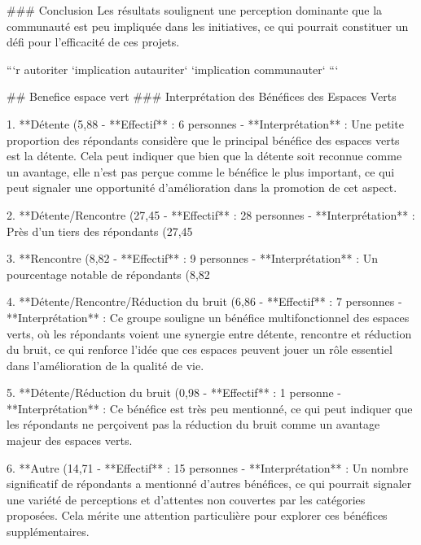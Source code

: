 ### Conclusion
Les résultats soulignent une perception dominante que la communauté est peu impliquée dans les initiatives, ce qui pourrait constituer un défi pour l'efficacité de ces projets.

```{r autoriter}
`implication autauriter`
`implication communauter`
```

## Benefice espace vert
### Interprétation des Bénéfices des Espaces Verts

1. **Détente (5,88%
   - **Effectif** : 6 personnes
   - **Interprétation** : Une petite proportion des répondants considère que le principal bénéfice des espaces verts est la détente. Cela peut indiquer que bien que la détente soit reconnue comme un avantage, elle n'est pas perçue comme le bénéfice le plus important, ce qui peut signaler une opportunité d'amélioration dans la promotion de cet aspect.

2. **Détente/Rencontre (27,45%
   - **Effectif** : 28 personnes
   - **Interprétation** : Près d'un tiers des répondants (27,45%

3. **Rencontre (8,82%
   - **Effectif** : 9 personnes
   - **Interprétation** : Un pourcentage notable de répondants (8,82%

4. **Détente/Rencontre/Réduction du bruit (6,86%
   - **Effectif** : 7 personnes
   - **Interprétation** : Ce groupe souligne un bénéfice multifonctionnel des espaces verts, où les répondants voient une synergie entre détente, rencontre et réduction du bruit, ce qui renforce l'idée que ces espaces peuvent jouer un rôle essentiel dans l'amélioration de la qualité de vie.

5. **Détente/Réduction du bruit (0,98%
   - **Effectif** : 1 personne
   - **Interprétation** : Ce bénéfice est très peu mentionné, ce qui peut indiquer que les répondants ne perçoivent pas la réduction du bruit comme un avantage majeur des espaces verts.

6. **Autre (14,71%
   - **Effectif** : 15 personnes
   - **Interprétation** : Un nombre significatif de répondants a mentionné d'autres bénéfices, ce qui pourrait signaler une variété de perceptions et d'attentes non couvertes par les catégories proposées. Cela mérite une attention particulière pour explorer ces bénéfices supplémentaires.


